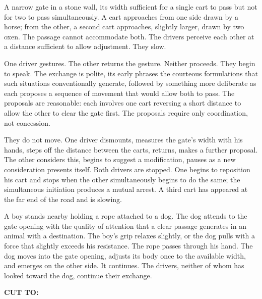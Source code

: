 \documentclass[12pt, oneside]{article}
\newcommand{\sceneheading}[1]{%
  \vspace{1.8em}%
  \noindent{\bfseries\large\MakeUppercase{#1}}%
  \vspace{0.6em}%
  \par\noindent{\color{rulecolor}\rule{\linewidth}{0.3pt}}%
  \vspace{0.5em}\par%
}
\newenvironment{action}{%
  \vspace{0.6em}%
  \noindent\ignorespaces%
}{%
  \par\vspace{0.6em}%
}
\newcommand{\scenenumber}[1]{%
  \vspace{1em}%
  \noindent{\small\bfseries\scshape Scene #1}%
  \vspace{0.3em}\par%
}
\newcommand{\transition}[1]{%
  \vspace{0.8em}%
  \begin{flushright}%
    \bfseries #1%
  \end{flushright}%
  \vspace{0.5em}%
}
\begin{document}
\begin{action}
A narrow gate in a stone wall, its width sufficient for a single cart to pass but not for two to pass simultaneously. A cart approaches from one side drawn by a horse; from the other, a second cart approaches, slightly larger, drawn by two oxen. The passage cannot accommodate both. The drivers perceive each other at a distance sufficient to allow adjustment. They slow.

One driver gestures. The other returns the gesture. Neither proceeds. They begin to speak. The exchange is polite, its early phrases the courteous formulations that such situations conventionally generate, followed by something more deliberate as each proposes a sequence of movement that would allow both to pass. The proposals are reasonable: each involves one cart reversing a short distance to allow the other to clear the gate first. The proposals require only coordination, not concession.

They do not move. One driver dismounts, measures the gate's width with his hands, steps off the distance between the carts, returns, makes a further proposal. The other considers this, begins to suggest a modification, pauses as a new consideration presents itself. Both drivers are stopped. One begins to reposition his cart and stops when the other simultaneously begins to do the same; the simultaneous initiation produces a mutual arrest. A third cart has appeared at the far end of the road and is slowing.

A boy stands nearby holding a rope attached to a dog. The dog attends to the gate opening with the quality of attention that a clear passage generates in an animal with a destination. The boy's grip relaxes slightly, or the dog pulls with a force that slightly exceeds his resistance. The rope passes through his hand. The dog moves into the gate opening, adjusts its body once to the available width, and emerges on the other side. It continues. The drivers, neither of whom has looked toward the dog, continue their exchange.
\end{action}

\transition{CUT TO:}

\scenenumber{16f — The Ledge}

\sceneheading{EXT. Rock Ledge — Day}
\end{document}

